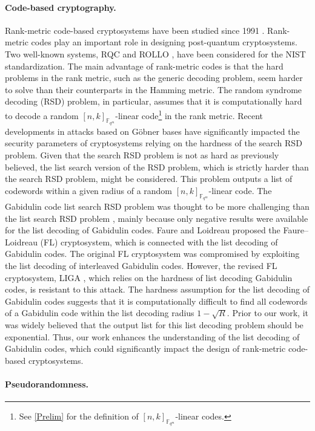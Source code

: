 \documentclass[11pt]{article}
\theoremstyle{plain}
\theoremstyle{definition}
\theoremstyle{remark}
\newcommand{\F}{\mathbb{F}}
\begin{document}
\paragraph{Code-based cryptography.} Rank-metric code-based cryptosystems have been studied since 1991 \cite{PT91,CS96}. Rank-metric codes play an important role in designing post-quantum cryptosystems. Two well-known systems, RQC \cite{MAB2019b} and ROLLO \cite{MAB2019a}, have been considered for the NIST standardization. The main advantage of rank-metric codes is that the hard problems in the rank metric, such as the generic decoding problem, seem harder to solve than their counterparts in the Hamming metric. The random syndrome decoding (RSD) problem, in particular, assumes that it is computationally hard to decode a random $[n,k]_{\F_{q^m}}$-linear code\footnote{See \cref{Prelim} for the definition of $[n,k]_{\F_{q^m}}$-linear codes.} in the rank metric. Recent developments in attacks based on G\"obner bases \cite{BBBGNRT20a,BBCGPSTV20b} have significantly impacted the security parameters of cryptosystems relying on the hardness of the search RSD problem. Given that the search RSD problem is not as hard as previously believed, the list search version of the RSD problem, which is strictly harder than the search RSD problem, might be considered. This problem outputs a list of codewords within a given radius of a random $[n,k]_{\F_{q^m}}$-linear code. The Gabidulin code list search RSD problem was thought to be more challenging than the list search RSD problem \cite{RJBPLW20}, mainly because only negative results were available for the list decoding of Gabidulin codes. Faure and Loidreau \cite{FL05} proposed the Faure–Loidreau (FL) cryptosystem, which is connected with the list decoding of Gabidulin codes. The original FL cryptosystem was compromised by exploiting the list decoding of interleaved Gabidulin codes. However, the revised FL cryptosystem, LIGA \cite{RPW21}, which relies on the hardness of list decoding Gabidulin codes, is resistant to this attack. The hardness assumption for the list decoding of Gabidulin codes suggests that it is computationally difficult to find all codewords of a Gabidulin code within the list decoding radius $1-\sqrt{R}$. Prior to our work, it was widely believed that the output list for this list decoding problem should be exponential. Thus, our work enhances the understanding of the list decoding of Gabidulin codes, which could significantly impact the design of rank-metric code-based cryptosystems.

\paragraph{Pseudorandomness.}
\end{document}
